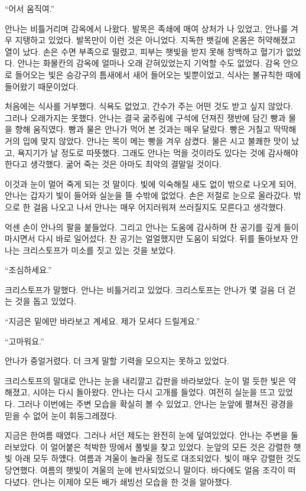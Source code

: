 \forceindent``어서 움직여.''

안나는 비틀거리며 감옥에서 나왔다. 발목은 족쇄에 매여 상처가 나 있었고, 안나를 겨우 지탱하고 있었다. 발목만이 이런 것은 아니었다. 지독한 뱃길에 온몸은 허약해졌고 열이 났다. 손은 수면 부족으로 떨렸고, 피부는 햇빛을 받지 못해 창백하고 혈기가 없었다. 안나는 화물칸의 감옥에 얼마나 오래 갇혀있었는지 기억할 수도 없었다. 감옥 안으로 들어오는 빛은 승강구의 틈새에서 새어 들어오는 빛뿐이었고, 식사는 불규칙한 때에 들어왔기 때문이었다.

처음에는 식사를 거부했다. 식욕도 없었고, 간수가 주는 어떤 것도 받고 싶지 않았다. 그러나 오래가지는 못했다. 안나는 결국 굶주림에 구석에 던져진 쟁반에 담긴 빵과 물을 향해 움직였다. 빵과 물은 안나가 먹어 본 것과는 매우 달랐다. 빵은 거칠고 딱딱해 거의 입에 맞지 않았다. 안나는 목이 메는 빵을 겨우 삼켰다. 물은 시고 불쾌한 맛이 났고, 욕지기가 날 정도로 따뜻했다. 그래도 안나는 먹을 것이라도 있다는 것에 감사해야 한다고 생각했다. 굶어 죽는 것은 아마도 최악의 결말일 것이다.

이것과 눈이 멀어 죽게 되는 것 말이다. 빛에 익숙해질 새도 없이 밖으로 나오게 되어, 안나는 갑자기 빛이 들어와 실눈을 뜰 수밖에 없었다. 손은 저절로 눈으로 올라갔다. 밖으로 한 걸음 나오고 나서 안나는 매우 어지러워져 쓰러질지도 모른다고 생각했다.

억센 손이 안나의 팔을 붙들었다. 그리고 안나는 도움에 감사하며 찬 공기를 깊게 들이마시면서 다시 바로 일어섰다. 찬 공기는 얼얼했지만 도움이 되었다. 뒤를 돌아보자 안나는 크리스토프가 미소를 짓고 있는 것을 보았다.

``조심하세요.''

크리스토프가 말했다. 안나는 비틀거리고 있었다. 크리스토프는 안나가 몇 걸음 더 걷는 것을 돕고 있었다.

``지금은 밑에만 바라보고 계세요. 제가 모셔다 드릴게요.''

``고마워요.''

안나가 중얼거렸다. 더 크게 말할 기력을 모으지는 못하고 있었다.

크리스토프의 말대로 안나는 눈을 내리깔고 갑판을 바라보았다. 눈이 멀 듯한 빛은 약해졌고, 시야는 다시 돌아왔다. 안나는 다시 고개를 들었다. 여전히 실눈을 뜨고 있었다. 그러나 이번에는 주변 모습을 확실히 볼 수 있었고, 안나는 눈앞에 펼쳐진 광경을 믿을 수 없어 눈이 휘둥그레졌다.

지금은 한여름 때였다. 그러나 서던 제도는 완전히 눈에 덮여있었다. 안나는 주변을 둘러보았다. 이 얼어붙은 척박한 땅에서 풀빛을 찾고 있었다. 눈앞의 모든 것은 강렬한 햇빛 아래 모두 하얬다. 여름과 겨울이 놀라울 정도로 대조되었다. 빛이 매우 강렬한 것도 당연했다. 여름의 햇빛이 겨울의 눈에 반사되었으니 말이다. 바다에도 얼음 조각이 떠다녔다. 안나는 이제야 모든 배가 쇄빙선 모습을 한 것을 알아챘다.

